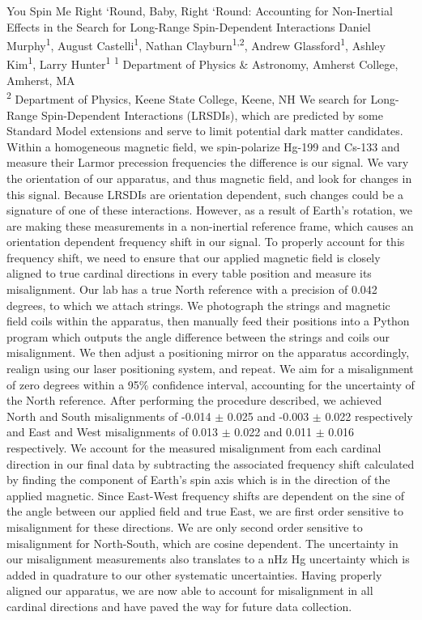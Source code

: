 \makeabstract
    {
    You Spin Me Right {\textquoteleft}Round, Baby, Right {\textquoteleft}Round: Accounting for Non-Inertial Effects in the Search for Long-Range Spin-Dependent Interactions
    }
    {
    Daniel Murphy\textsuperscript{1}, August Castelli\textsuperscript{1}, Nathan Clayburn\textsuperscript{1,2}, Andrew Glassford\textsuperscript{1}, Ashley Kim\textsuperscript{1}, Larry Hunter\textsuperscript{1}
    }
    {
    \textsuperscript{1} Department of Physics \& Astronomy, Amherst College, Amherst, MA\\
\textsuperscript{2} Department of Physics, Keene State College, Keene, NH
    }
    {
    We search for Long-Range Spin-Dependent Interactions (LRSDIs), which are predicted by some Standard Model extensions and serve to limit potential dark matter candidates. Within a homogeneous magnetic field, we spin-polarize Hg-199 and Cs-133 and measure their Larmor precession frequencies {\textendash} the difference is our signal. We vary the orientation of our apparatus, and thus magnetic field, and look for changes in this signal. Because LRSDIs are orientation dependent, such changes could be a signature of one of these interactions. However, as a result of Earth's rotation, we are making these measurements in a non-inertial reference frame, which causes an orientation dependent frequency shift in our signal. To properly account for this frequency shift, we need to ensure that our applied magnetic field is closely aligned to true cardinal directions in every table position and measure its misalignment.
    }
    {
    Our lab has a true North reference with a precision of 0.042 degrees, to which we attach strings. We photograph the strings and magnetic field coils within the apparatus, then manually feed their positions into a Python program which outputs the angle difference between the strings and coils {\textendash} our misalignment. We then adjust a positioning mirror on the apparatus accordingly, realign using our laser positioning system, and repeat. We aim for a misalignment of zero degrees within a 95\% confidence interval, accounting for the uncertainty of the North reference.
    }
    {
    After performing the procedure described, we achieved North and South misalignments of -0.014{\textdegree} \ensuremath{\pm} 0.025{\textdegree}  and -0.003{\textdegree} \ensuremath{\pm} 0.022{\textdegree} respectively and East and West misalignments of 0.013{\textdegree} \ensuremath{\pm} 0.022{\textdegree} and 0.011{\textdegree} \ensuremath{\pm} 0.016{\textdegree} respectively. We account for the measured misalignment from each cardinal direction in our final data by subtracting the associated frequency shift calculated by finding the component of Earth{\textquoteright}s spin axis which is in the direction of the applied magnetic. Since East-West frequency shifts are dependent on the sine of the angle between our applied field and true East, we are first order sensitive to misalignment for these directions. We are only second order sensitive to misalignment for North-South, which are cosine dependent. The uncertainty in our misalignment measurements also translates to a nHz Hg uncertainty which is added in quadrature to our other systematic uncertainties.
    }
    {
    Having properly aligned our apparatus, we are now able to account for misalignment in all cardinal directions and have paved the way for future data collection.
    }

    \newpage
    